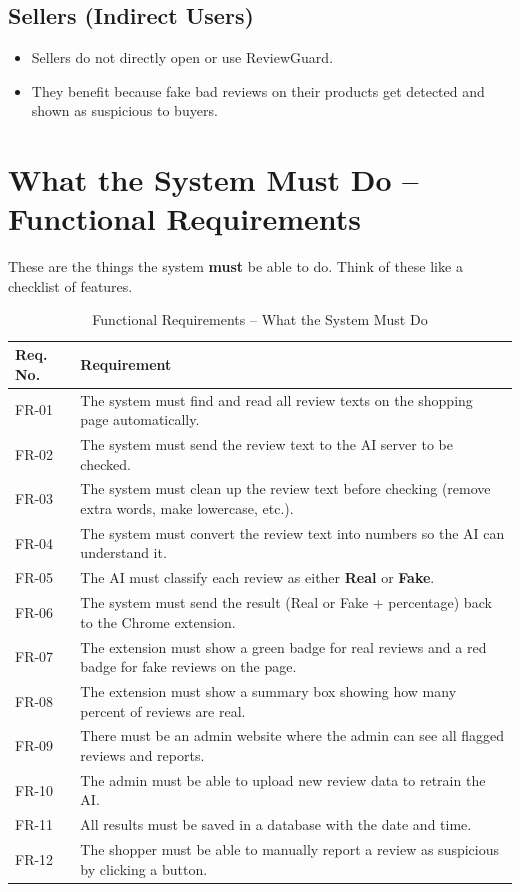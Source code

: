 \documentclass[10pt, a4paper]{report}
\begin{document}
\subsection{Sellers (Indirect Users)}
\begin{itemize}
  \item Sellers do not directly open or use ReviewGuard.
  \item They benefit because fake bad reviews on their products get detected and shown as suspicious to buyers.
\end{itemize}

\section{What the System Must Do -- Functional Requirements}

These are the things the system \textbf{must} be able to do. Think of these like a checklist of features.

\begin{table}[H]
\centering
\caption{Functional Requirements -- What the System Must Do}
\begin{tabularx}{\textwidth}{lX}
\toprule
\textbf{Req. No.} & \textbf{Requirement} \\
\midrule
FR-01 & The system must find and read all review texts on the shopping page automatically. \\
FR-02 & The system must send the review text to the AI server to be checked. \\
FR-03 & The system must clean up the review text before checking (remove extra words, make lowercase, etc.). \\
FR-04 & The system must convert the review text into numbers so the AI can understand it. \\
FR-05 & The AI must classify each review as either \textbf{Real} or \textbf{Fake}. \\
FR-06 & The system must send the result (Real or Fake + percentage) back to the Chrome extension. \\
FR-07 & The extension must show a green badge for real reviews and a red badge for fake reviews on the page. \\
FR-08 & The extension must show a summary box showing how many percent of reviews are real. \\
FR-09 & There must be an admin website where the admin can see all flagged reviews and reports. \\
FR-10 & The admin must be able to upload new review data to retrain the AI. \\
FR-11 & All results must be saved in a database with the date and time. \\
FR-12 & The shopper must be able to manually report a review as suspicious by clicking a button. \\
\bottomrule
\end{tabularx}
\end{table}
\end{document}

